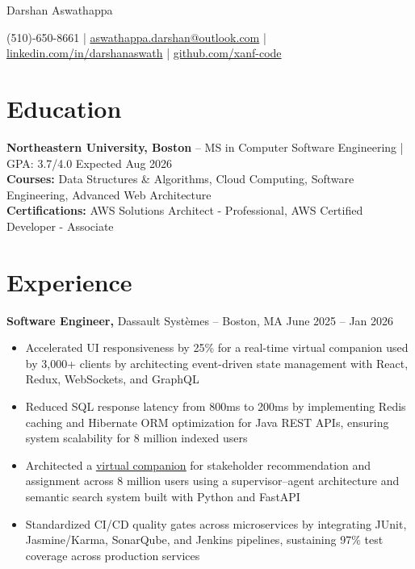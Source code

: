 \documentclass[11pt]{article}
\begin{document}
\centerline{\Huge Darshan Aswathappa}

\vspace{5pt}

\centerline{(510)-650-8661 | \href{mailto:aswathappa.darshan@outlook.com}{aswathappa.darshan@outlook.com} | \href{https://www.linkedin.com/in/darshanaswath/}{linkedin.com/in/darshanaswath} | \href{https://github.com/xanf-code}{github.com/xanf-code}}

\vspace{-10pt}

\section*{Education}
\textbf{Northeastern University, Boston} -- MS in Computer Software Engineering | GPA: 3.7/4.0
\hfill Expected Aug 2026 \\
\vspace{3px}
\textbf{Courses:} Data Structures \& Algorithms, Cloud Computing, Software Engineering, Advanced Web Architecture \\
\vspace{3px}
\textbf{Certifications:} AWS Solutions Architect - Professional, AWS Certified Developer - Associate
\vspace{-6.5pt}

\section*{Experience}

\textbf{Software Engineer,} {Dassault Syst\`{e}mes} -- Boston, MA \hfill June 2025 -- Jan 2026 \\
\vspace{-9pt}
\begin{itemize}
    \item Accelerated UI responsiveness by 25\% for a real-time virtual companion used by 3,000+ clients by architecting event-driven state management with React, Redux, WebSockets, and GraphQL
    \item Reduced SQL response latency from 800ms to 200ms by implementing Redis caching and Hibernate ORM optimization for Java REST APIs, ensuring system scalability for 8 million indexed users
    \item Architected a \uline{\href{https://www.3ds.com/newsroom/press-releases/dassault-systemes-unveils-new-way-working-industry-ai-powered-virtual-companions}{virtual companion}} for stakeholder recommendation and assignment across 8 million users using a supervisor--agent architecture and semantic search system built with Python and FastAPI
    \item Standardized CI/CD quality gates across microservices by integrating JUnit, Jasmine/Karma, SonarQube, and Jenkins pipelines, sustaining 97\% test coverage across production services
\end{itemize}
\end{document}
